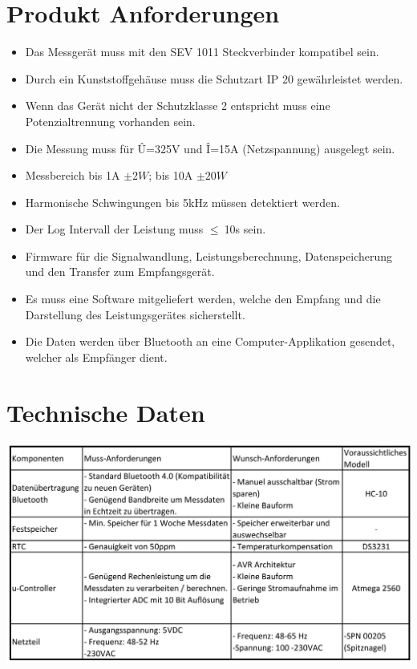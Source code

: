 \documentclass[12pt,a4paper]{article}
\begin{document}
\newpage
\section{Produkt Anforderungen}
\begin{itemize}
\item Das Messgerät muss mit den SEV 1011 Steckverbinder kompatibel sein.
\item Durch ein Kunststoffgehäuse muss die Schutzart IP 20 gewährleistet werden.
\item Wenn das Gerät nicht der Schutzklasse 2 entspricht muss eine Potenzialtrennung vorhanden sein.
\item Die Messung muss für Û=325V und Î=15A (Netzspannung) ausgelegt sein.
\item Messbereich bis 1A $\pm2W$; bis 10A $\pm 20W$
\item Harmonische Schwingungen bis 5kHz müssen detektiert werden.
\item Der Log Intervall der Leistung muss $\leq \ $10s sein.

\item Firmware für die Signalwandlung, Leistungsberechnung, Datenspeicherung und den Transfer zum Empfangsgerät.
\item Es muss eine Software mitgeliefert werden, welche den Empfang und die Darstellung des Leistungsgerätes sicherstellt. 

\item Die Daten werden über Bluetooth an eine Computer-Applikation gesendet, welcher als Empfänger dient. 
\end{itemize}


\section{Technische Daten}

 \includegraphics[scale=0.45]{Komp-1.jpg}
\end{document}
